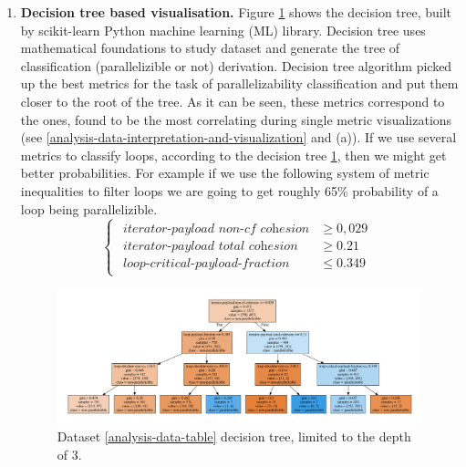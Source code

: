 \begin{enumerate}[align=left,leftmargin=*]
\begin{enumerate}
\item \textbf{Decision tree based visualisation.}\newline
\null\qquad Figure \ref{results-decision-tree} shows the decision tree, built by scikit-learn \cite{python-lib-scikit-learn} Python machine learning (ML) library. Decision tree uses mathematical foundations to study dataset and generate the tree of classification (parallelizible or not) derivation.\newline 
\null\qquad Decision tree algorithm picked up the best metrics for the task of parallelizability classification and put them closer to the root of the tree. As it can be seen, these metrics correspond to the ones, found to be the most correlating during single metric visualizations (see \ref{analysis-data-interpretation-and-visualization} and (a)).\newline
\null\qquad If we use several metrics to classify loops, according to the decision tree \ref{results-decision-tree}, then we might get better probabilities. For example if we use the following system of metric inequalities to filter loops we are going to get roughly 65\% probability of a loop being parallelizible. 
\begin{equation*}
\begin{cases}
\begin{aligned}
\textit{iterator-payload non-cf cohesion}            &\ge 0,029 \\[1ex]
\textit{iterator-payload total cohesion} &\ge 0.21 \\[1ex]
\textit{loop-critical-payload-fraction} &\leq 0.349
\end{aligned}
\end{cases}
\end{equation*}\newline
\begin{figure}
\centering
\includegraphics[width=\linewidth]{figs/decision-tree-depth-3.pdf}
\caption{Dataset \ref{analysis-data-table} decision tree, limited to the depth of 3.}
\label{results-decision-tree}
\end{figure}


\end{enumerate}
\end{enumerate}
